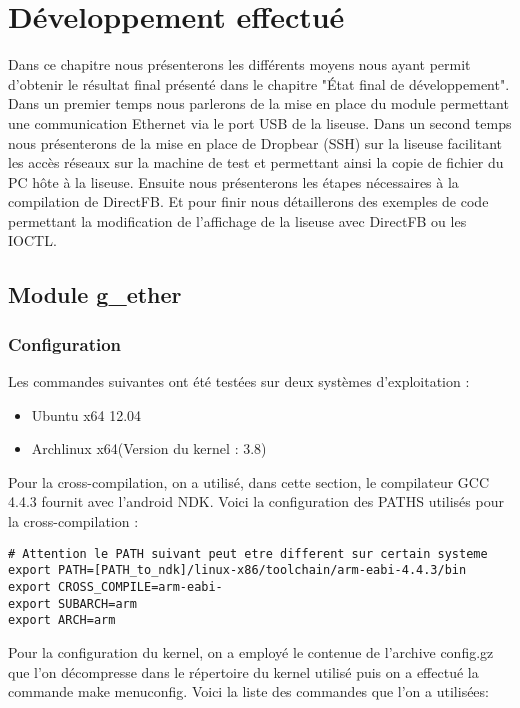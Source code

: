 \chapter{Développement effectué}
Dans ce chapitre nous présenterons les différents moyens nous ayant permit d'obtenir le résultat final présenté dans le chapitre "État final de développement".\\ 
Dans un premier temps nous parlerons de la mise en place du module permettant une communication Ethernet via le port USB de la liseuse. Dans un second temps nous présenterons de la mise en place de Dropbear (SSH) sur la liseuse facilitant les accès réseaux sur la machine de test et permettant ainsi la copie de fichier du PC hôte à la liseuse. Ensuite nous présenterons les étapes nécessaires à la compilation de DirectFB. Et pour finir nous détaillerons des exemples de code permettant la modification de l'affichage de la liseuse avec DirectFB ou les IOCTL.

\section{Module g_ether}
\subsection{Configuration}
Les commandes suivantes ont été testées sur deux systèmes d'exploitation : 

\begin{itemize}

\item Ubuntu x64 12.04 
\item Archlinux x64(Version du kernel : 3.8)

\end{itemize}

Pour la cross-compilation, on a utilisé, dans cette section, le compilateur GCC 4.4.3 fournit avec l'android NDK. Voici la configuration des PATHS utilisés pour la cross-compilation :

\begin{lstlisting}
# Attention le PATH suivant peut etre different sur certain systeme
export PATH=[PATH_to_ndk]/linux-x86/toolchain/arm-eabi-4.4.3/bin 
export CROSS_COMPILE=arm-eabi-
export SUBARCH=arm
export ARCH=arm
\end{lstlisting}

Pour la configuration du kernel, on a employé le contenue de l'archive config.gz que l'on décompresse dans le répertoire du kernel utilisé puis on a effectué la commande make menuconfig. Voici la liste des commandes que l'on a utilisées:

